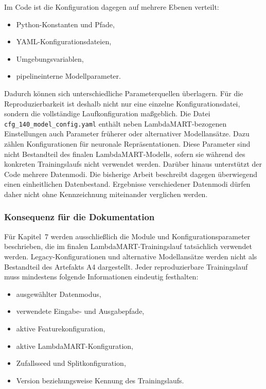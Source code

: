 Im Code ist die Konfiguration dagegen auf mehrere Ebenen verteilt: 

\begin{itemize} 
    \item Python-Konstanten und Pfade, 
    \item YAML-Konfigurationsdateien, 
    \item Umgebungsvariablen, 
    \item pipelineinterne Modellparameter. 
\end{itemize} 

Dadurch können sich unterschiedliche Parameterquellen überlagern. Für die Reproduzierbarkeit ist deshalb nicht nur eine einzelne Konfigurationsdatei, sondern die vollständige Laufkonfiguration maßgeblich. 
Die Datei \texttt{cfg\_140\_model\_config.yaml} enthält neben LambdaMART-bezogenen Einstellungen auch Parameter früherer oder alternativer Modellansätze. Dazu zählen Konfigurationen für neuronale Repräsentationen. 
Diese Parameter sind nicht Bestandteil des finalen LambdaMART-Modells, sofern sie während des konkreten Trainingslaufs nicht verwendet werden. Darüber hinaus unterstützt der Code mehrere Datenmodi. 
Die bisherige Arbeit beschreibt dagegen überwiegend einen einheitlichen Datenbestand. Ergebnisse verschiedener Datenmodi dürfen daher nicht ohne Kennzeichnung miteinander verglichen werden. 

\subsubsection*{Konsequenz für die Dokumentation} 

Für Kapitel~7 werden ausschließlich die Module und Konfigurationsparameter beschrieben, die im finalen LambdaMART-Trainingslauf tatsächlich verwendet werden. 
Legacy-Konfigurationen und alternative Modellansätze werden nicht als Bestandteil des Artefakts A4 dargestellt. Jeder reproduzierbare Trainingslauf muss mindestens folgende Informationen eindeutig festhalten: 
\begin{itemize} 
    \item ausgewählter Datenmodus, 
    \item verwendete Eingabe- und Ausgabepfade, 
    \item aktive Featurekonfiguration, 
    \item aktive LambdaMART-Konfiguration, 
    \item Zufallsseed und Splitkonfiguration, 
    \item Version beziehungsweise Kennung des Trainingslaufs. 
\end{itemize} 


